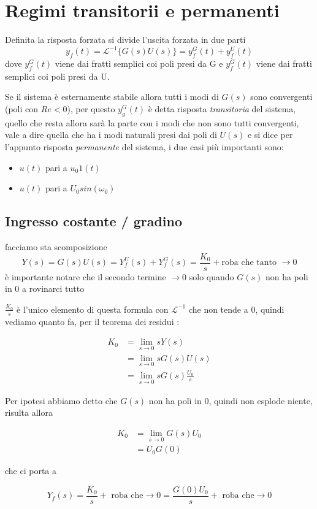 \documentclass[11pt]{article}
\date{\today}
\title{}
\begin{document}
\tableofcontents

\section{Regimi transitorii e permanenti}
\label{sec:orge662209}
Definita la risposta forzata si divide l'uscita forzata in due parti
\[y_f (t) = \mathcal{L}^{-1} \{G(s) U(s)\} = y_f^G(t) + y_f^U(t)\]
dove \(y_f^G (t)\) viene dai fratti semplici coi poli presi da G e
\(y_f^G (t)\) viene dai fratti semplici coi poli presi da U.

Se il sistema è esternamente stabile allora tutti i modi di \(G(s)\)
sono convergenti (poli con \(Re < 0\)), per questo \(y_g^G (t)\) è detta
risposta \emph{transitoria} del sistema, quello che resta allora sarà la
parte con i modi che non sono tutti convergenti, vale a dire quella
che ha i modi naturali presi dai poli di \(U(s)\) e si dice per
l'appunto risposta \emph{permanente} del sistema, i due casi più importanti
sono:
\begin{itemize}
\item \(u(t)\) pari a \(u_0 1(t)\)
\item \(u(t)\) pari a \(U_0 sin(\omega _0)\)
\end{itemize}

\subsection{Ingresso costante / gradino}
\label{sec:org358aea2}

facciamo sta scomposizione
\[ Y(s) = G(s) U(s) = Y_f^U(s) + Y_f^G(s)
=\frac{K_0}{s} + \text{roba che tanto } \to 0\]
è importante notare che il secondo termine \(\to 0\) solo quando \(G(s)\)
non ha poli in 0 a rovinarci tutto\par

\(\frac{K_0}{s}\) è l'unico elemento di questa formula con
\(\mathcal{L}^{-1}\) che non tende a 0, quindi vediamo quanto fa, per il
teorema dei residui :

\begin{align*}
K_0 &= \lim_{s \to 0} sY(s) \\
&= \lim_{s \to 0} s G(s) U(s)\\
&= \lim_{s \to 0} s G(s) \frac{U_0}{s}
\end{align*}

Per ipotesi abbiamo detto che \(G(s)\) non ha poli in 0, quindi non
esplode niente, risulta allora

\begin{align*}
K_0 &= \lim_{s \to 0} G(s) U_0 \\
&= U_0 G(0)
\end{align*}

che ci porta a

\[ Y_f (s) = \frac{K_0}{s} + \text{ roba che} \to 0 =
\frac{G(0)U_0}{s} + \text{ roba che} \to 0\]
\end{document}
